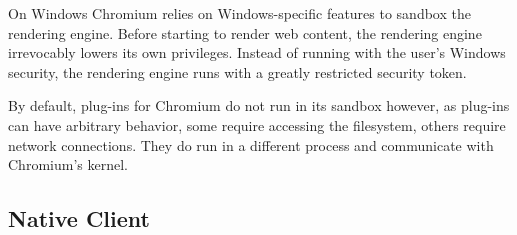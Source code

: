 On Windows Chromium relies on Windows-specific features to sandbox the rendering
engine. Before starting to render web content, the rendering engine irrevocably
lowers its own privileges. Instead of running with the user's Windows security,
the rendering engine runs with a greatly restricted security token.

By default, plug-ins for Chromium do not run in its sandbox however, as
plug-ins can have arbitrary behavior, some require accessing the filesystem,
others require network connections. They do run in a different process and
communicate with Chromium's kernel.

\subsection {Native Client}


